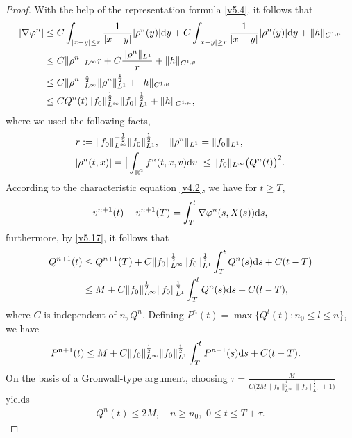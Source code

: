 \documentclass[11pt,reqno]{amsart}%
\theoremstyle{definition}
\theoremstyle{remark}
\begin{document}
\begin{proof}
With the help of the representation formula  \eqref{v5.4}, it follows that
\begin{align}
|\nabla \varphi^{n}|&\leq C \int_{|x-y|\leq r}\frac{1}{|x-y|}|\rho^{n}(y)|{\rm d}y +C \int_{|x-y|\geq r}\frac{1}{|x-y|}|\rho^{n}(y)|{\rm d}y + \|h\|_{C^{1,\mu}}\nonumber\\
&\leq C\|\rho^{n}\|_{L^{\infty}}r+C\frac{\|\rho^{n}\|_{L^{1}}}{r}+ \|h\|_{C^{1,\mu}}\nonumber\\
&\leq C\|\rho^{n}\|^{\frac{1}{2}}_{L^{\infty}}\|\rho^{n}\|^{\frac{1}{2}}_{L^{1}}+ \|h\|_{C^{1,\mu}}\nonumber\\
&\leq C Q^{n}(t) \|f_{0}\|^{\frac{1}{2}}_{L^{\infty}}\|f_{0}\|^{\frac{1}{2}}_{L^{1}}+ \|h\|_{C^{1,\mu}},\nonumber
\end{align}
where we used the following facts,
\begin{align}
&r:=\|f_{0}\|^{-\frac{1}{2}}_{L^{\infty}}\|f_{0}\|^{\frac{1}{2}}_{L^{1}},\quad \|\rho^{n}\|_{L^{1}}=\|f_{0}\|_{L^{1}},\nonumber\\
&|\rho^{n}(t,x)|=\big|\int_{\mathbb{R}^{2}}f^{n}(t,x,v){\rm d} v\big|\leq \|f_{0}\|_{L^{\infty}}\big(Q^{n}(t)\big)^{2}.\nonumber
\end{align}
According to the characteristic equation \eqref{v4.2}, we have  for $t\geq T$,
\begin{align}
v^{n+1}(t)-v^{n+1}(T)=\int_{T}^{t}\nabla \varphi^{n}(s,X(s)){\rm d}s,\nonumber
\end{align}
furthermore, by \eqref{v5.17}, it follows that
\begin{align}
Q^{n+1}(t)&\leq Q^{n+1}(T)+C\|f_{0}\|^{\frac{1}{2}}_{L^{\infty}}\|f_{0}\|^{\frac{1}{2}}_{L^{1}}\int^{t}_{T} Q^{n}(s){\rm d}s+C(t-T)\nonumber\\
&\leq M+C\|f_{0}\|^{\frac{1}{2}}_{L^{\infty}}\|f_{0}\|^{\frac{1}{2}}_{L^{1}}\int^{t}_{T} Q^{n}(s){\rm d}s +C(t-T),\nonumber
\end{align}
where $C$ is independent of $n,Q^{n}$.
Defining $P^{n}(t)=\max\big\{Q^{l}(t): n_{0}\leq l\leq n\big\}$, we have
\begin{align}
P^{n+1}(t)
&\leq M+C\|f_{0}\|^{\frac{1}{2}}_{L^{\infty}}\|f_{0}\|^{\frac{1}{2}}_{L^{1}}\int^{t}_{T} P^{n+1}(s){\rm d}s +C(t-T).\nonumber
\end{align}
  On the basis of a Gronwall-type   argument, choosing $\tau=\frac{M}{C\big(2M\|f_{0}\|^{\frac{1}{2}}_{L^{\infty}}\|f_{0}\|^{\frac{1}{2}}_{L^{1}}+1\big)}$  yields
\begin{align}
Q^{n}(t)\leq 2M, \quad n\geq n_{0},\,\, 0\leq t\leq T+\tau. \nonumber
\end{align}
\end{proof}
\end{document}
